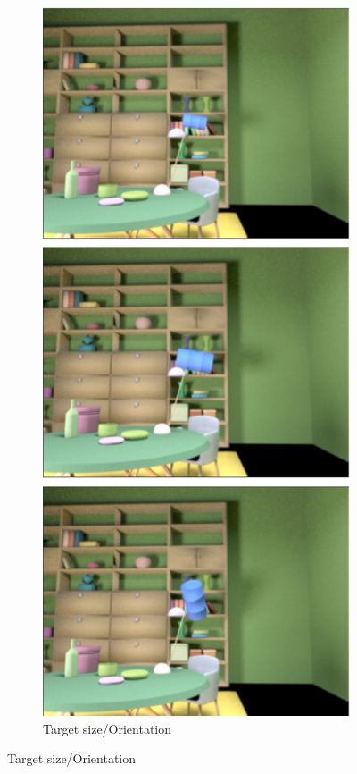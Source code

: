 \documentclass{jov}
\begin{document}
\begin{figure}
\begin{subfigure}[b]{0.18 \textwidth}
        \label{fig:targetPositionVariation}
    \end{subfigure}
    ~
	\begin{subfigure}[b]{0.18 \textwidth}
    \centering
        \caption{Target size/Orientation}
        \includegraphics[width=\textwidth]{../FiguresDraft5/Figure4/Figure4_b.pdf}

\end{subfigure}
\end{figure}
\end{document}
